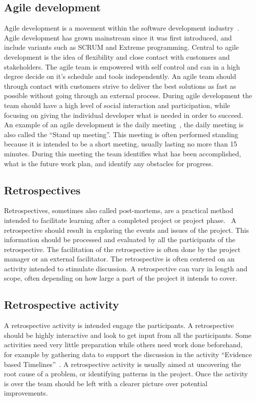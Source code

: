 \documentclass[12pt]{article}
\begin{document}
\subsection{Agile development}
Agile development is a movement within the software development industry~\cite{Tessem2014}. Agile development has grown mainstream since it was first introduced, and include variants such as SCRUM and Extreme programming. Central to agile development is the idea of flexibility and close contact with customers and stakeholders. The agile team is empowered with self control and can in a high degree decide on it's schedule and tools independently. An agile team should through contact with customers strive to deliver the best solutions as fast as possible without going through an external process. During agile development the team should have a high level of social interaction and participation, while focusing on giving the individual developer what is needed in order to succeed. An example of an agile development is the daily meeting~\cite{Stray2012}, the daily meeting is also called the ``Stand up meeting''. This meeting is often performed standing because it is intended to be a short meeting, usually lasting no more than 15 minutes. During this meeting the team identifies what has been accomplished, what is the future work plan, and identify any obstacles for progress.

\subsection{Retrospectives}
Retrospectives, sometimes also called post-mortems, are a practical method intended to facilitate learning after a completed project or project phase.~\cite{Dingsoyr2005} A retrospective should result in exploring the events and issues of the project. This information should be processed and evaluated by all the participants of the retrospective. The facilitation of the retrospective is often done by the project manager or an external facilitator. The retrospective is often centered on an activity intended to stimulate discussion. A retrospective can vary in length and scope, often depending on how large a part of the project it intends to cover.

\subsection{Retrospective activity}
A retrospective activity is intended engage the participants. A retrospective should be highly interactive and look to get input from all the participants. Some activities need very little preparation while others need work done beforehand, for example by gathering data to support the discussion in the activity ``Evidence based Timelines''~\cite{Bjarnason2012}. A retrospective activity is usually aimed at uncovering the root cause of a problem, or identifying patterns in the project. Once the activity is over the team should be left with a clearer picture over potential improvements.
\end{document}
